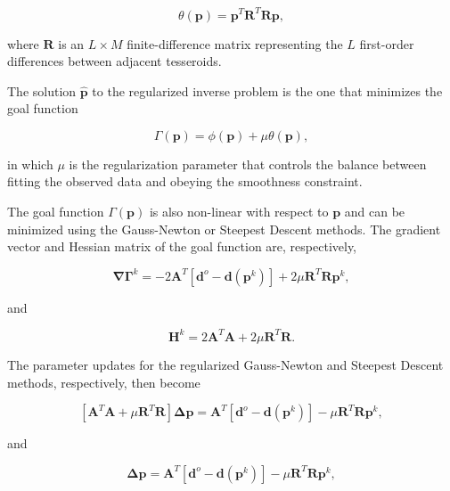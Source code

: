 \begin{equation}
    \theta(\mathbf{p}) = \mathbf{p}^T\mathbf{R}^T\mathbf{R}\mathbf{p},
    \label{eq:p3-regul}
\end{equation}

\noindent where $\mathbf{R}$ is an $L \times M$ finite-difference matrix
representing the $L$ first-order differences between adjacent tesseroids.

The solution $\hat{\mathbf{p}}$ to the regularized inverse problem is the one that
minimizes the goal function

\begin{equation}
    \Gamma(\mathbf{p}) = \phi(\mathbf{p}) + \mu\theta(\mathbf{p}),
    \label{eq:p3-goalfunction}
\end{equation}

\noindent
in which $\mu$ is the regularization parameter that controls the balance
between fitting the observed data and obeying the smoothness constraint.

The goal function $\Gamma(\mathbf{p})$ is also non-linear with respect to
$\mathbf{p}$ and can be minimized using the Gauss-Newton or Steepest Descent
methods.
The gradient vector and Hessian matrix of the goal function are, respectively,

\begin{equation}
    \mathbf{\nabla\Gamma}^k =
        -2\mathbf{A}^T[\mathbf{d}^o - \mathbf{d}(\mathbf{p}^k)] +
        2\mu\mathbf{R}^T\mathbf{R}\mathbf{p}^k,
    \label{eq:p3-gradient-regul}
\end{equation}

\noindent and

\begin{equation}
    \mathbf{H}^k = 2\mathbf{A}^T\mathbf{A} + 2\mu\mathbf{R}^T\mathbf{R}.
    \label{eq:p3-hessian-regul}
\end{equation}

\noindent The parameter updates for the regularized Gauss-Newton and Steepest
Descent methods, respectively, then become

\begin{equation}
    \left[\mathbf{A}^T\mathbf{A} + \mu\mathbf{R}^T\mathbf{R}\right]
    \mathbf{\Delta p} =
        \mathbf{A}^T[\mathbf{d}^o - \mathbf{d}(\mathbf{p}^k)] -
        \mu\mathbf{R}^T\mathbf{R}\mathbf{p}^k,
    \label{eq:p3-gaussnewton-regul}
\end{equation}

\noindent and

\begin{equation}
    \mathbf{\Delta p} =
        \mathbf{A}^T[\mathbf{d}^o - \mathbf{d}(\mathbf{p}^k)] -
        \mu\mathbf{R}^T\mathbf{R}\mathbf{p}^k,
    \label{eq:p3-steepest-regul}
\end{equation}


